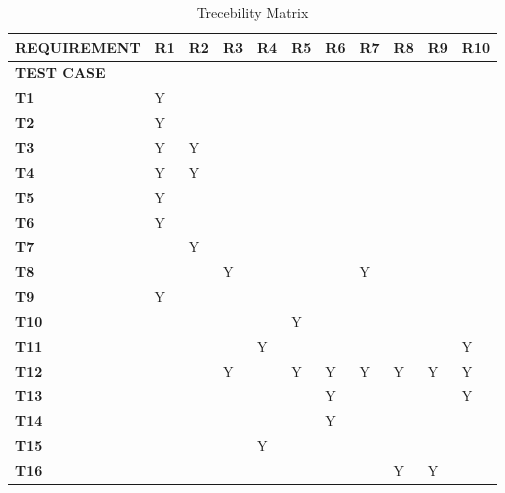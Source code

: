 \documentclass[]{article}
\begin{document}
\begin{table}[]
\centering
\caption{Trecebility Matrix}
\label{my-label}
\begin{tabular}{|l|l|l|l|l|l|l|l|l|l|l|}
\hline
 \textbf{REQUIREMENT} & \textbf{R1}  & \textbf{R2} & \textbf{R3} & \textbf{R4}  & \textbf{R5} & \textbf{R6} & \textbf{R7} & \textbf{R8} &\textbf{R9} & \textbf{R10}   \\ \hline
 \textbf{TEST CASE}&  &  &  &  &  &  &  &  &  &    \\ \hline
\textbf{T1} & Y &  &  &  &  &  &  &  &  &    \\ \hline
 \textbf{T2}& Y &  &  &  &  &  &  &  &  &    \\ \hline
 \textbf{T3}& Y & Y&  &  &  &  &  &  &  &    \\ \hline
 \textbf{T4}& Y & Y&  &  &  &  &  &  &  &    \\ \hline
 \textbf{T5}& Y &  &  &  &  &  &  &  &  &    \\ \hline
\textbf{T6} & Y &  &  &  &  &  &  &  &  &    \\ \hline
 \textbf{T7}&  & Y &  &  &  &  &  &  &  &    \\ \hline
 \textbf{T8}&  &  & Y&  &  &  &  Y&  &  &    \\ \hline
 \textbf{T9}& Y &  &  &  &  &  &  &  &  &    \\ \hline
 \textbf{T10}&  &  &  &  & Y &  &  &  &  &    \\ \hline
 \textbf{T11}&  &  &  &Y  &  &  &  &  &  &Y    \\ \hline
 \textbf{T12}&  &  & Y&  &  Y&Y &Y &Y &Y  &Y    \\ \hline
 \textbf{T13}&  &  &  &  &  &  Y&  &  &  &  Y  \\ \hline
 \textbf{T14}&  &  &  &  &  &  Y&  &  &  &    \\ \hline
 \textbf{T15} &  &  & &Y  &  &  &  &  &  &    \\ \hline
 \textbf{T16}&  &  &  &  &  &  &  &  Y&Y  &    \\ \hline
\end{tabular}
\end{table}
\end{document}
